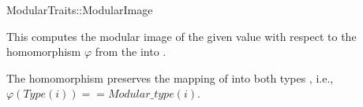 \begin{ccRefFunctionObjectConcept}{ModularTraits::ModularImage}

\ccDefinition

This  computes the modular image of the given value 
with respect to the homomorphism $\varphi$ from the  into
.

The homomorphism preserves the mapping of  into both types
, i.e., $\varphi(Type(i)) == Modular\_type(i)$.


\ccTypes
{}


 
\ccRefines 
{} 

\end{ccRefFunctionObjectConcept}
